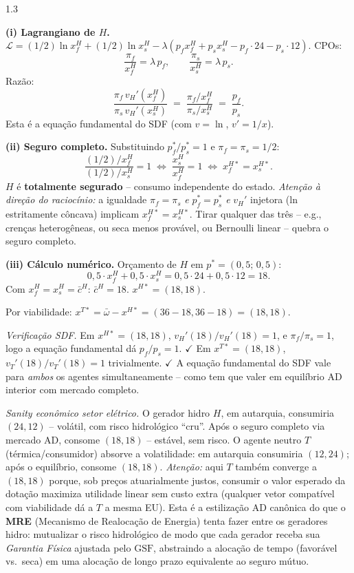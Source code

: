 \documentclass[11pt,addpoints]{exam}
\newcommand{\GSF}{\text{GSF}}
\begin{document}
\begin{spacing}{1.3}
\begin{questions}
\begin{parts}
\begin{solution}
\textbf{(i) Lagrangiano de $H$.} $\mathcal{L} = (1/2)\ln x^H_f + (1/2)\ln x^H_s - \lambda(p_f x^H_f + p_s x^H_s - p_f\cdot 24 - p_s\cdot 12)$. CPOs:
\[
    \frac{\pi_f}{x^H_f} = \lambda\, p_f,\qquad \frac{\pi_s}{x^H_s} = \lambda\, p_s.
\]
Razão:
\[
    \boxed{\;\frac{\pi_f\, v_H'(x^H_f)}{\pi_s\, v_H'(x^H_s)} \;=\; \frac{\pi_f / x^H_f}{\pi_s / x^H_s} \;=\; \frac{p_f}{p_s}.\;}
\]
Esta é a equação fundamental do SDF (com $v = \ln$, $v' = 1/x$).

\textbf{(ii) Seguro completo.} Substituindo $p^*_f/p^*_s = 1$ e $\pi_f = \pi_s = 1/2$:
\[
    \frac{(1/2)/x^H_f}{(1/2)/x^H_s} = 1 \;\Longleftrightarrow\; \frac{x^H_s}{x^H_f} = 1 \;\Longleftrightarrow\; x^{H*}_f = x^{H*}_s.
\]
$H$ é \textbf{totalmente segurado} -- consumo independente do estado. \emph{Atenção à direção do raciocínio:} a igualdade $\pi_f = \pi_s$ \emph{e} $p^*_f = p^*_s$ \emph{e} $v_H'$ injetora (ln estritamente côncava) implicam $x^{H*}_f = x^{H*}_s$. Tirar qualquer das três -- e.g., crenças heterogêneas, ou seca menos provável, ou Bernoulli linear -- quebra o seguro completo.

\textbf{(iii) Cálculo numérico.} Orçamento de $H$ em $p^* = (0{,}5;\,0{,}5)$:
\[
    0{,}5\cdot x^H_f + 0{,}5\cdot x^H_s = 0{,}5\cdot 24 + 0{,}5\cdot 12 = 18.
\]
Com $x^H_f = x^H_s = \bar c^H$: $\bar c^H = 18$. $\boxed{x^{H*} = (18, 18).}$

Por viabilidade: $x^{T*} = \bar\omega - x^{H*} = (36 - 18, 36 - 18) = \boxed{(18, 18)}.$

\emph{Verificação SDF.} Em $x^{H*} = (18, 18)$, $v_H'(18)/v_H'(18) = 1$, e $\pi_f/\pi_s = 1$, logo a equação fundamental dá $p_f/p_s = 1$. $\checkmark$ Em $x^{T*} = (18, 18)$, $v_T'(18)/v_T'(18) = 1$ trivialmente. $\checkmark$ A equação fundamental do SDF vale para \emph{ambos} os agentes simultaneamente -- como tem que valer em equilíbrio AD interior com mercado completo.

\textit{Sanity econômico setor elétrico.} O gerador hidro $H$, em autarquia, consumiria $(24, 12)$ -- volátil, com risco hidrológico ``cru''. Após o seguro completo via mercado AD, consome $(18, 18)$ -- estável, sem risco. O agente neutro $T$ (térmica/consumidor) absorve a volatilidade: em autarquia consumiria $(12, 24)$; após o equilíbrio, consome $(18, 18)$. \emph{Atenção:} aqui $T$ também converge a $(18, 18)$ porque, sob preços atuarialmente justos, consumir o valor esperado da dotação maximiza utilidade linear sem custo extra (qualquer vetor compatível com viabilidade dá a $T$ a mesma EU). Esta é a estilização AD canônica do que o \textbf{MRE} (Mecanismo de Realocação de Energia) tenta fazer entre os geradores hidro: mutualizar o risco hidrológico de modo que cada gerador receba sua \emph{Garantia Física} ajustada pelo $\GSF$, abstraindo a alocação de tempo (favorável vs.\ seca) em uma alocação de longo prazo equivalente ao seguro mútuo.
\end{solution}


\end{parts}
\end{questions}
\end{spacing}
\end{document}
